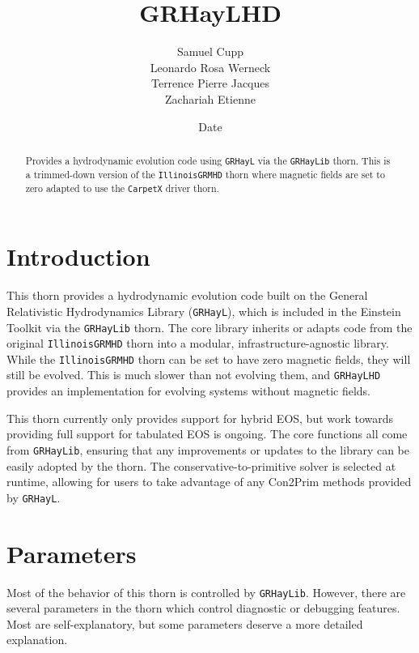 \documentclass{article}
\newcommand{\grhayl}{\texttt{GRHayL}\xspace}
\newcommand{\glib}{\texttt{GRHayLib}\xspace}
\newcommand{\ghd}{\texttt{GRHayLHD}\xspace}
\newcommand{\igm}{\texttt{IllinoisGRMHD}\xspace}
\begin{document}
\title{GRHayLHD}
\author{Samuel Cupp \\ Leonardo Rosa Werneck \\ Terrence Pierre Jacques \\ Zachariah Etienne}
\date{$ $Date$ $}

\maketitle


\begin{abstract}
Provides a hydrodynamic evolution code using \grhayl via the
\glib thorn. This is a trimmed-down version of the \igm thorn
where magnetic fields are set to zero adapted to use the
\texttt{CarpetX} driver thorn.
\end{abstract}

\section{Introduction}

This thorn provides a hydrodynamic evolution code built on
the General Relativistic Hydrodynamics Library (\grhayl),
which is included in the Einstein Toolkit via the \glib
thorn. The core library inherits or adapts code from the
original \igm thorn into a modular, infrastructure-agnostic
library. While the \igm thorn can be set to have
zero magnetic fields, they will still be evolved. This
is much slower than not evolving them, and \ghd provides an
implementation for evolving systems without magnetic
fields.

This thorn currently only provides support for hybrid EOS, but
work towards providing full support for tabulated EOS is ongoing.
 The core functions all come from \glib,
ensuring that any improvements or updates to the library can
be easily adopted by the thorn. The conservative-to-primitive
solver is selected at runtime, allowing for users to take
advantage of any Con2Prim methods provided by \grhayl.

\section{Parameters}

Most of the behavior of this thorn is controlled by \glib. However,
there are several parameters in the thorn which control diagnostic
or debugging features. Most are self-explanatory, but some parameters
deserve a more detailed explanation.
\end{document}

